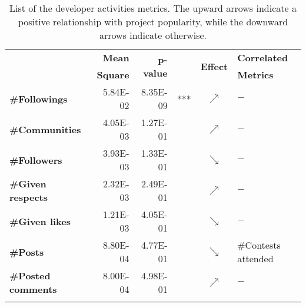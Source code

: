 \begin{table}[t]
\centering
\setlength{\tabcolsep}{2.5pt}
\caption{List of the developer activities metrics. The upward arrows indicate a positive relationship with project popularity, while the downward arrows indicate otherwise.}
\label{table:RQ5}
\begin{tabular}{|>{\bfseries}l|r|rl|c|l|}
	\hline
	\multirow{2}{*}{Metric} & \textbf{Mean}  & \multirow{2}{*}{\textbf{p-value}}  &     & \multirow{2}{*}{\textbf{Effect}}     &\textbf{Correlated}\\
	&\textbf{Square}&& &&\textbf{Metrics} \\
	\hline	\hline
\#Followings     & 5.84E-02 & 8.35E-09 & *** & $\nearrow$ &              $-$        \\
\#Communities       & 4.05E-03 & 1.27E-01 &     & $\nearrow$ &             $-$         \\
\#Followers      & 3.93E-03 & 1.33E-01 &     & $\searrow$ &              $-$        \\
\#Given respects      & 2.32E-03 & 2.49E-01 &     & $\nearrow$ &               $-$       \\
\#Given likes           & 1.21E-03 & 4.05E-01 &     & $\searrow$ &              $-$        \\
\#Posts           & 8.80E-04 & 4.77E-01 &     & $\searrow$ & \#Contests attended            \\
\#Posted comments & 8.00E-04 & 4.98E-01 &     & $\nearrow$ &              $-$          \\ \hline
\multicolumn{6}{l}{$p-value$ codes:  `***'$<0$, `**'$<0.001$, `*'$<0.01$, `.'$<0.05$}\\                      
\end{tabular}
\end{table}